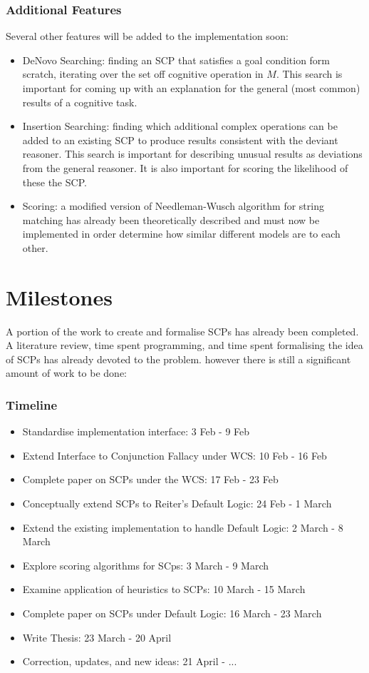 \documentclass{article}
\begin{document}
\subsubsection{Additional Features}
Several other features will be added to the implementation soon:
\begin{itemize}
\item DeNovo Searching: finding an SCP that satisfies a goal condition form scratch, iterating over the set off cognitive operation in $M$. This search is important for coming up with an explanation for the general (most common) results of a cognitive task.
\item Insertion Searching: finding which additional complex operations can be added to an existing SCP to produce results consistent with the deviant reasoner. This search is important for describing unusual results as deviations from the general reasoner. It is also important for scoring the likelihood of these the SCP.
\item Scoring: a modified version of Needleman-Wusch algorithm for string matching has already been theoretically described and must now be implemented in order determine how similar different models are to each other.
\end{itemize}


\section{Milestones}
A portion of the work to create and formalise SCPs has already been completed. A literature review, time spent programming, and time spent formalising the idea of SCPs has already devoted to the problem. however there is still a significant amount of work to be done:
\subsubsection*{Timeline}
\begin{itemize}
\item Standardise implementation interface: 3 Feb - 9 Feb
\item Extend Interface to Conjunction Fallacy under WCS: 10 Feb - 16 Feb
\item Complete paper on SCPs under the WCS: 17 Feb - 23 Feb
\item Conceptually extend SCPs to Reiter's Default Logic: 24 Feb - 1 March
\item Extend the existing implementation to handle Default Logic: 2 March - 8 March
\item Explore scoring algorithms for SCps: 3 March - 9 March
\item Examine application of heuristics to SCPs: 10 March - 15 March
\item Complete paper on SCPs under Default Logic: 16 March - 23 March
\item Write Thesis: 23 March - 20 April
\item Correction, updates, and new ideas: 21 April - ...
\end{itemize}
\end{document}
